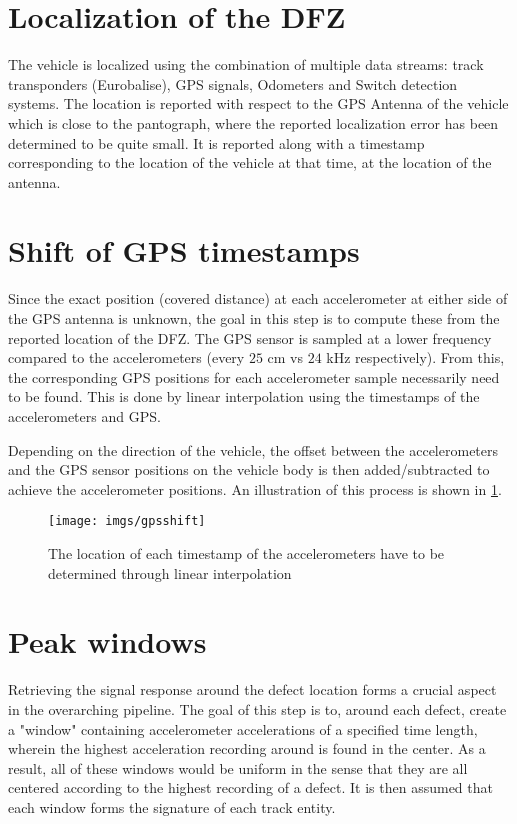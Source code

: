 
\section{Localization of the DFZ}

The vehicle is localized using the combination of multiple data streams: track transponders (Eurobalise), GPS signals, Odometers and Switch detection systems. The location is reported with respect to the GPS Antenna of the vehicle which is close to the pantograph, where the reported localization error has been determined to be quite small. It is reported along with a timestamp corresponding to the location of the vehicle at that time, at the location of the antenna. 

\section{Shift of GPS timestamps}
Since the exact position (covered distance) at each accelerometer at either side of the GPS antenna is unknown, the goal in this step is to compute these from the reported location of the DFZ. The GPS sensor is sampled at a lower frequency compared to the accelerometers (every $25$ cm vs $24$ kHz respectively). From this, the corresponding GPS positions for each accelerometer sample necessarily need to be found. This is done by linear interpolation using the timestamps of the accelerometers and GPS. 

Depending on the direction of the vehicle, the offset between the accelerometers and the GPS sensor positions on the vehicle body is then added/subtracted to achieve the accelerometer positions. An illustration of this process is shown in \ref{fig:gpsshift}.

\begin{figure}[H]
	\centering
	\texttt{[image: imgs/gpsshift]}
	\caption{The location of each timestamp of the accelerometers have to be determined through linear interpolation}
	\label{fig:gpsshift}
\end{figure}

\section{Peak windows}
Retrieving the signal response around the defect location forms a crucial aspect in the overarching pipeline. The goal of this step is to, around each defect, create a "window" containing accelerometer accelerations of a specified time length, wherein the highest acceleration recording around is found in the center. As a result, all of these windows would be uniform in the sense that they are all centered according to the highest recording of a defect. It is then assumed that each window forms the signature of each track entity. 

